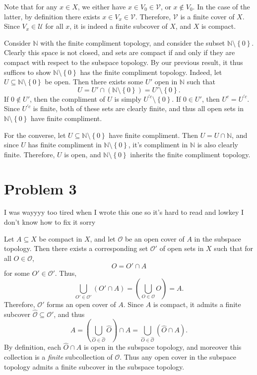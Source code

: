 \documentclass[11pt, letterpaper]{article}
\begin{document}
Note that for any $x\in X$, we either have $x\in V_0\in \mathcal{V} $, or $x\notin V_0$. In the case of the latter, by definition there exists $x\in V_x\in \mathcal{V} $. Therefore, $\mathcal{V} $ is a finite cover of $X$. Since $V_x\in \mathcal{U} $ for all $x$, it is indeed a finite subcover of $X$, and $X$ is compact.

Consider $\mathbb{N} $ with the finite compliment topology, and consider the subset $\mathbb{N} \setminus \left\{ 0 \right\} $. Clearly this space is not closed, and sets are compact if and only if they are compact with respect to the subspace topology. By our previous result, it thus suffices to show $\mathbb{N} \setminus \left\{ 0 \right\} $ has the finite compliment topology. Indeed, let $U\subseteq \mathbb{N}\setminus \left\{ 0 \right\}  $ be open. Then there exists some $U'$ open in $\mathbb{N} $ such that
\[
	U=U' \cap \left( \mathbb{N} \setminus \left\{ 0 \right\}  \right) =U'\setminus \left\{ 0 \right\} 
.\]
If $0\notin U'$, then the compliment of $U$ is simply $U^{\prime c} \setminus \left\{ 0 \right\} $. If $0\in U'$, then $U^{c} =U^{\prime c} $. Since $U^{\prime c} $ is finite, both of these sets are clearly finite, and thus all open sets in $\mathbb{N} \setminus \left\{ 0 \right\} $ have finite compliment.

For the converse, let $U\subseteq \mathbb{N} \setminus \left\{ 0 \right\} $ have finite compliment. Then $U=U \cap \mathbb{N} $, and since $U$ has finite compliment in $\mathbb{N} \setminus \left\{ 0 \right\} $, it's compliment in $\mathbb{N} $ is also clearly finite. Therefore, $U$ is open, and $\mathbb{N} \setminus \left\{ 0 \right\} $ inherits the finite compliment topology.
\section*{Problem 3}
I was wayyyy too tired when I wrote this one so it's hard to read and lowkey I don't know how to fix it sorry

Let $A\subseteq X$ be compact in $X$, and let $\mathcal{O} $ be an open cover of $A$ in the subspace topology. Then there exists a corresponding set $\mathcal{O} '$ of open sets in $X$ such that for all $O\in \mathcal{O} $,
\[
	O=O' \cap A
\]
for some $O'\in \mathcal{O} '$. Thus,
\[
	\bigcup_{O'\in \mathcal{O}'} \left( O' \cap A \right) =\left( \bigcup_{O\in \mathcal{O} } O \right)=A
.\]
Therefore, $\mathcal{O} '$ forms an open cover of $A$. Since $A$ is compact, it admits a finite subcover $\hat{\mathcal{O}}\subseteq \mathcal{O} '$, and thus
\[
	A=\left( \bigcup_{\hat{O}\in \hat{\mathcal{O}}} \hat{O} \right) \cap A=\bigcup_{\hat{O}\in \hat{\mathcal{O}}} \left( \hat{O} \cap A \right)
.\]
By definition, each $\hat{O} \cap A$ is open in the subspace topology, and moreover this collection is a \emph{finite} subcollection of $\mathcal{O} $. Thus any open cover in the subspace topology admits a finite subcover in the subspace topology.
\end{document}
